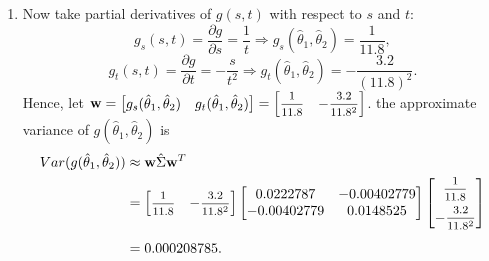 \begin{solution}
    \begin{enumerate}
        \item Now take partial derivatives of $g(s,t)$ with respect to $s$ and $t$:
        \[
            g_s(s,t) = \frac{\partial g}{\partial s} = \frac{1}{t} \Longrightarrow g_s(\hat{\theta}_1, \hat{\theta}_2) = \frac{1}{11.8},
        \]
        \[
            g_t(s,t) = \frac{\partial g}{\partial t} = -\frac{s}{t^2} \Longrightarrow g_t(\hat{\theta}_1, \hat{\theta}_2) = -\frac{3.2}{(11.8)^2}.
        \]
        Hence, 
        let $\mathbf{w} = \begin{bmatrix}
            g_s(\hat{\theta}_1, \hat{\theta}_2) &
            g_t(\hat{\theta}_1, \hat{\theta}_2)
        \end{bmatrix} = \begin{bmatrix}
            \mfrac{1}{11.8} &
            -\mfrac{3.2}{11.8^2}
        \end{bmatrix}$.
        the approximate variance of $g(\hat{\theta}_1, \hat{\theta}_2)$ is
        \begin{align*}
            Var(g(\hat{\theta}_1, \hat{\theta}_2)) &\approx \mathbf{w} \hat{\Sigma} \mathbf{w}^T \\
            &= \begin{bmatrix}
                \mfrac{1}{11.8} &
                -\mfrac{3.2}{11.8^2}
            \end{bmatrix}
            \begin{bmatrix}
                0.0222787 & -0.00402779 \\
                -0.00402779 & 0.0148525
            \end{bmatrix}
            \begin{bmatrix}
                \mfrac{1}{11.8} \\[0.6em]
                -\mfrac{3.2}{11.8^2}
            \end{bmatrix}\\[0.6em]
            &= 0.000208785.
        \end{align*}


\end{enumerate}
\end{solution}
